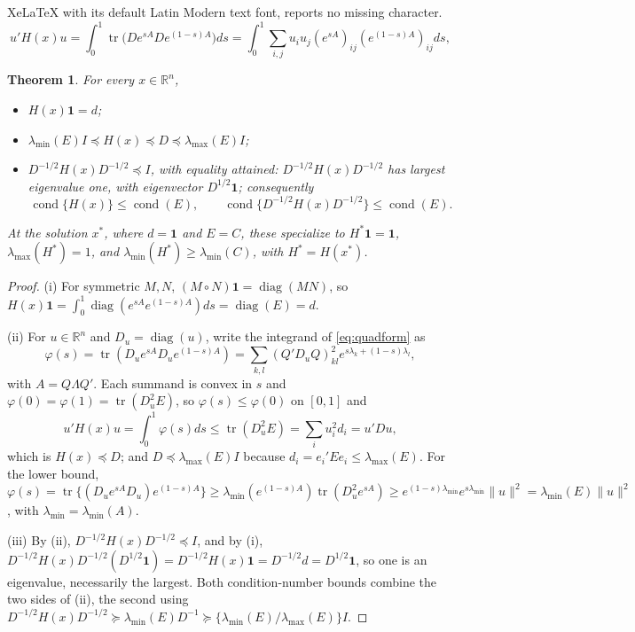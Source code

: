 \documentclass[10pt,a4paper]{amsart}
\newtheorem{theorem}{Theorem}
\newcommand{\R}{\mathbb{R}}
\newcommand{\diag}{\operatorname{diag}}
\newcommand{\one}{\mathbf{1}}
\newcommand{\tr}{\operatorname{tr}}
\begin{document}
XeLaTeX with its default Latin Modern text font, reports no missing character.
\begin{equation}\label{eq:quadform}
u'H(x)u=\int_{0}^{1}\tr\big(De^{sA}De^{(1-s)A}\big)ds
=\int_{0}^{1}\sum_{i,j}u_iu_j(e^{sA})_{ij}(e^{(1-s)A})_{ij}ds ,
\end{equation}

\begin{theorem}\label{prop:spec}
For every $x\in\R^{n}$,
\begin{itemize}
\item[(i)] $H(x)\one=d$;
\item[(ii)] $\lambda_{\min}(E)I\preceq H(x)\preceq D\preceq\lambda_{\max}(E)I$;
\item[(iii)] $D^{-1/2}H(x)D^{-1/2}\preceq I$, with equality attained:
$D^{-1/2}H(x)D^{-1/2}$ has largest eigenvalue one, with eigenvector
$D^{1/2}\one$; consequently
\[
\operatorname{cond}\{H(x)\}\leq\operatorname{cond}(E),
\qquad
\operatorname{cond}\{D^{-1/2}H(x)D^{-1/2}\}\leq\operatorname{cond}(E).
\]
\end{itemize}
At the solution $x^{\ast}$, where $d=\one$ and $E=C$, these specialize
to $H^{\ast}\one=\one$, $\lambda_{\max}(H^{\ast})=1$, and
$\lambda_{\min}(H^{\ast})\geq\lambda_{\min}(C)$, with
$H^{\ast}=H(x^{\ast})$.
\end{theorem}

\begin{proof}
(i) For symmetric $M,N$, $(M\circ N)\one=\diag(MN)$, so
$H(x)\one=\int_{0}^{1}\diag(e^{sA}e^{(1-s)A})ds=\diag(E)=d$.

(ii) For $u\in\R^{n}$ and $D_u=\diag(u)$, write the integrand of
\eqref{eq:quadform} as
\[
\varphi(s)=\tr(D_ue^{sA}D_ue^{(1-s)A})
=\sum_{k,l}(Q'D_uQ)_{kl}^{2}e^{s\lambda_k+(1-s)\lambda_l},
\]
with $A=Q\Lambda Q'$. Each summand is convex in $s$ and
$\varphi(0)=\varphi(1)=\tr(D_u^{2}E)$, so $\varphi(s)\leq\varphi(0)$ on
$[0,1]$ and
\[
u'H(x)u=\int_{0}^{1}\varphi(s)ds\leq\tr(D_u^{2}E)
=\sum_i u_i^{2}d_i=u'Du ,
\]
which is $H(x)\preceq D$; and $D\preceq\lambda_{\max}(E)I$ because
$d_i=e_i'Ee_i\leq\lambda_{\max}(E)$. For the lower bound,
$\varphi(s)=\tr\{(D_ue^{sA}D_u)e^{(1-s)A}\}
\geq\lambda_{\min}(e^{(1-s)A})\tr(D_u^{2}e^{sA})
\geq e^{(1-s)\lambda_{\min}}e^{s\lambda_{\min}}\|u\|^{2}
=\lambda_{\min}(E)\|u\|^{2}$, with
$\lambda_{\min}=\lambda_{\min}(A)$.

(iii) By (ii), $D^{-1/2}H(x)D^{-1/2}\preceq I$, and by (i),
$D^{-1/2}H(x)D^{-1/2}(D^{1/2}\one)=D^{-1/2}H(x)\one=D^{-1/2}d
=D^{1/2}\one$, so one is an eigenvalue, necessarily the largest. Both
condition-number bounds combine the two sides of (ii), the second using
$D^{-1/2}H(x)D^{-1/2}\succeq\lambda_{\min}(E)D^{-1}\succeq
\{\lambda_{\min}(E)/\lambda_{\max}(E)\}I$.
\end{proof}
\end{document}
